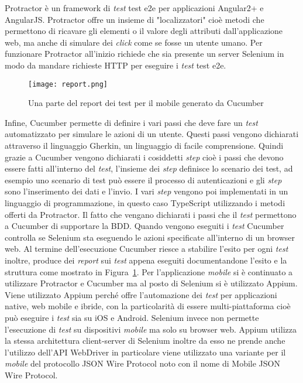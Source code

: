 Protractor è un \gls{framework}\ap{[g]} di \emph{test} \gls{test e2e} per applicazioni Angular2+ e AngularJS. Protractor offre un insieme di "localizzatori" cioè metodi che permettono di ricavare gli elementi o il valore degli attributi dall'applicazione web, ma anche di simulare dei \emph{click} come se fosse un utente umano. Per funzionare Protractor all'inizio richiede che sia presente un server Selenium in modo da mandare richieste HTTP per eseguire i \emph{test} \gls{test e2e}.\\

\begin{figure}[h] 
	\begin{center}
		\texttt{[image: report.png]}
		\caption{Una parte del report dei test per il mobile generato da Cucumber}\label{fig:testDoc}
	\end{center}
\end{figure}

Infine, Cucumber permette di definire i vari passi che deve fare un \emph{test} automatizzato per simulare le azioni di un utente. Questi passi vengono dichiarati attraverso il linguaggio Gherkin, un linguaggio di facile comprensione. Quindi grazie a Cucumber vengono dichiarati i cosiddetti \emph{step} cioè i passi che devono essere fatti all'interno del \emph{test}, l'insieme dei \emph{step} definisce lo scenario dei test, ad esempio uno scenario di test può essere il processo di autenticazioni e gli \emph{step} sono l'inserimento dei dati e l'invio. I vari \emph{step} vengono poi implementati in un linguaggio di programmazione, in questo caso TypeScript utilizzando i metodi offerti da Protractor. Il fatto che vengano dichiarati i passi che il \emph{test} permettono a Cucumber di supportare la BDD. Quando vengono eseguiti i \emph{test} Cucumber controlla se Selenium sta eseguendo le azioni specificate all’interno di un \gls{browser web}\ap{[g]}. Al termine dell'esecuzione Cucumber riesce a stabilire l'esito per ogni \emph{test} inoltre, produce dei \emph{report} sui \emph{test} appena eseguiti documentandone l'esito e la struttura come mostrato in Figura~\ref{fig:testDoc}.
\clearpage
Per l'applicazione \emph{mobile} si è continuato a utilizzare Protractor e Cucumber ma al posto di Selenium si è utilizzato Appium. Viene utilizzato Appium perché offre l'automazione dei \emph{test} per applicazioni native, web mobile e ibride, con la particolarità di essere multi-piattaforma cioè può eseguire i \emph{test} sia su \gls{iOS}\ap{[g]} e \gls{Android}\ap{[g]}. Selenium invece non permette l'esecuzione di \emph{test} su dispositivi \emph{mobile} ma solo su \gls{browser web}\ap{[g]}. Appium utilizza la stessa architettura client-server di Selenium inoltre da esso ne prende anche l'utilizzo dell'API WebDriver in particolare viene utilizzato una variante per il \emph{mobile} del protocollo JSON Wire Protocol noto con il nome di Mobile JSON Wire Protocol. 

